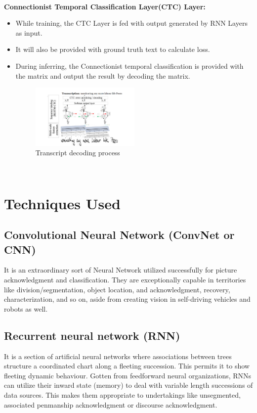 \documentclass[12pt, conference]{IEEEtran}
\begin{document}
\textbf{}\\
\textbf{Connectionist Temporal Classification Layer(CTC) Layer:}
\begin{itemize}
    \item While training, the CTC Layer is fed with output generated by RNN Layers as input.
    \item It will also be provided with ground truth text to calculate loss.
    \item During inferring, the Connectionist temporal classification is provided with the matrix and output the result by decoding the matrix.
    \begin{figure}[h]
        \centering
        \includegraphics[width=0.5\textwidth]{img3.jpg}
        \caption{Transcript decoding process}
    \end{figure}
\end{itemize}

\textbf{\\}
\section{\textbf{Techniques Used}}
\subsection{\textbf{Convolutional Neural Network (ConvNet or CNN)}}
It is an extraordinary sort of Neural Network utilized successfully for picture acknowledgment and classification. They are exceptionally capable in territories like division/segmentation, object location, and acknowledgment, recovery, characterization, and so on, aside from creating vision in self-driving vehicles and robots as well.

\subsection{\textbf{Recurrent neural network (RNN)}}
It is a section of artificial neural networks where associations between trees structure a coordinated chart along a fleeting succession. This permits it to show fleeting dynamic behaviour. Gotten from feedforward neural organizations, RNNs can utilize their inward state (memory) to deal with variable length successions of data sources. This makes them appropriate to undertakings like unsegmented, associated penmanship acknowledgment or discourse acknowledgment.
\end{document}
